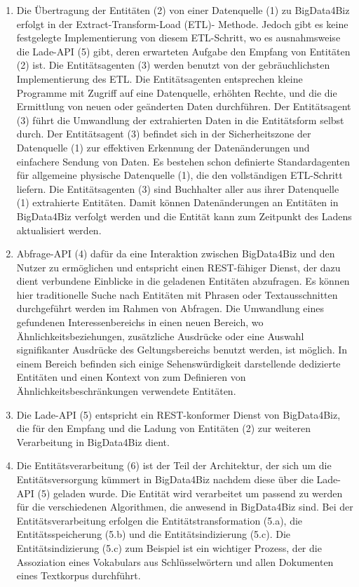\begin{enumerate}
	\item Die Übertragung der Entitäten (2) von einer Datenquelle (1) zu BigData4Biz erfolgt in der Extract-Transform-Load (ETL)- Methode. Jedoch gibt es keine festgelegte Implementierung von diesem ETL-Schritt, wo es ausnahmsweise die Lade-API (5) gibt, deren erwarteten Aufgabe den Empfang von Entitäten (2) ist. Die Entitätsagenten (3) werden benutzt von der gebräuchlichsten Implementierung des ETL. Die Entitätsagenten entsprechen kleine Programme mit Zugriff auf eine Datenquelle, erhöhten Rechte, und die die Ermittlung von neuen oder geänderten Daten durchführen. Der Entitätsagent (3) führt die Umwandlung der extrahierten Daten in die Entitätsform selbst durch. Der Entitätsagent (3) befindet sich in der Sicherheitszone der Datenquelle (1) zur effektiven Erkennung der Datenänderungen und einfachere Sendung von Daten. Es bestehen schon definierte Standardagenten für allgemeine physische Datenquelle (1), die den vollständigen ETL-Schritt liefern. Die Entitätsagenten (3) sind Buchhalter aller aus ihrer Datenquelle (1) extrahierte Entitäten. Damit können Datenänderungen an Entitäten in BigData4Biz verfolgt werden und die Entität kann zum Zeitpunkt des Ladens aktualisiert werden.
	
	\item Abfrage-API (4) dafür da eine Interaktion zwischen BigData4Biz und den Nutzer zu ermöglichen und entspricht einen REST-fähiger Dienst, der dazu dient verbundene Einblicke in die geladenen Entitäten abzufragen. Es können hier traditionelle Suche nach Entitäten mit Phrasen oder Textausschnitten durchgeführt werden im Rahmen von Abfragen. Die Umwandlung eines gefundenen Interessenbereichs in einen neuen Bereich, wo Ähnlichkeitsbeziehungen, zusätzliche Ausdrücke oder eine Auswahl signifikanter Ausdrücke des Geltungsbereichs benutzt werden, ist möglich. In einem Bereich befinden sich einige Sehenswürdigkeit darstellende dedizierte Entitäten und einen Kontext von zum Definieren von Ähnlichkeitsbeschränkungen verwendete Entitäten.
	
	\item Die Lade-API (5) entspricht ein REST-konformer Dienst von BigData4Biz, die für den Empfang und die Ladung von Entitäten (2) zur weiteren Verarbeitung in BigData4Biz dient.
	
	\item Die Entitätsverarbeitung (6) ist der Teil der Architektur, der sich um die Entitätsversorgung kümmert in BigData4Biz nachdem diese über die Lade-API (5) geladen wurde. Die Entität wird verarbeitet um passend zu werden für die verschiedenen Algorithmen, die anwesend in BigData4Biz sind. Bei der Entitätsverarbeitung erfolgen die Entitätstransformation (5.a), die Entitätsspeicherung (5.b) und die Entitätsindizierung (5.c). Die Entitätsindizierung (5.c) zum Beispiel ist ein wichtiger Prozess, der die Assoziation eines Vokabulars aus Schlüsselwörtern und allen Dokumenten eines Textkorpus durchführt.
	

\end{enumerate}
